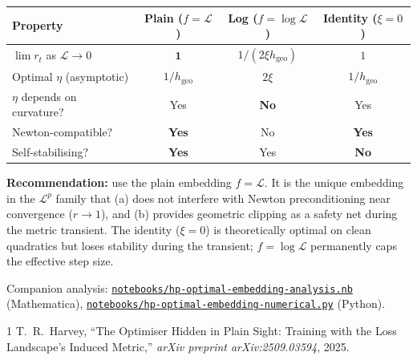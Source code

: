 \documentclass{article}
\newcommand{\loss}{\mathcal{L}}
\begin{document}
\begin{tcolorbox}[colback=gray!8, colframe=gray!22, breakable,
  title=\textbf{Embedding Choice Summary},
  coltitle=black]
\begin{center}
\small
\begin{tabular}{@{}lccc@{}}
    \toprule
    \textbf{Property} & \textbf{Plain} ($f=\loss$) & \textbf{Log} ($f=\log\loss$) & \textbf{Identity} ($\xi=0$) \\
    \midrule
    $\lim r_t$ as $\loss\to 0$ & $\mathbf{1}$ & $1/(2\xi h_\mathrm{geo})$ & $1$ \\
    Optimal $\eta$ (asymptotic) & $1/h_\mathrm{geo}$ & $2\xi$ & $1/h_\mathrm{geo}$ \\
    $\eta$ depends on curvature? & Yes & \textbf{No} & Yes \\
    Newton-compatible? & \textbf{Yes} & No & \textbf{Yes} \\
    Self-stabilising? & \textbf{Yes} & Yes & \textbf{No} \\
    \bottomrule
\end{tabular}
\end{center}

\medskip\noindent
\textbf{Recommendation:} use the plain embedding $f=\loss$.
It is the unique embedding in the $\loss^p$ family that
(a) does not interfere with Newton preconditioning near convergence ($r\to 1$), and
(b) provides geometric clipping as a safety net during the metric transient.
The identity ($\xi=0$) is theoretically optimal on clean quadratics but
loses stability during the transient;
$f=\log\loss$ permanently caps the effective step size.
\end{tcolorbox}

\noindent
Companion analysis:
\href{https://github.com/Noah-Everett/Induced-Metric-Optimiser/blob/main/notebooks/hp-optimal-embedding-analysis.nb}{\texttt{notebooks/hp-optimal-embedding-analysis.nb}} (Mathematica),
\href{https://github.com/Noah-Everett/Induced-Metric-Optimiser/blob/main/notebooks/hp-optimal-embedding-numerical.py}{\texttt{notebooks/hp-optimal-embedding-numerical.py}} (Python).


\begin{thebibliography}{1}
T.~R.~Harvey,
``The Optimiser Hidden in Plain Sight: Training with the Loss Landscape's Induced Metric,''
\emph{arXiv preprint arXiv:2509.03594}, 2025.
\end{thebibliography}
\end{document}
